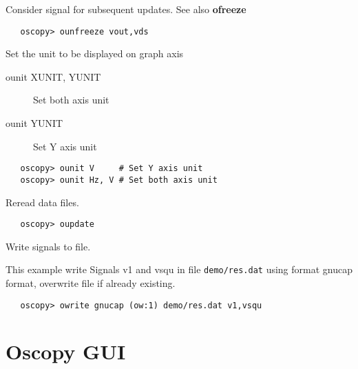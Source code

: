 \documentclass[a4paper,11pt]{article}
\begin{document}
   Consider signal for subsequent updates. See also \textbf{ofreeze}
\begin{verbatim}
   oscopy> ounfreeze vout,vds
\end{verbatim}

   Set the unit to be displayed on graph axis
   \begin{description}
   \item[ounit XUNIT, YUNIT] Set both axis unit
   \item[ounit YUNIT] Set Y axis unit
   \end{description}

\begin{verbatim}
   oscopy> ounit V     # Set Y axis unit
   oscopy> ounit Hz, V # Set both axis unit
\end{verbatim}

   Reread data files.

\begin{verbatim}
   oscopy> oupdate
\end{verbatim}

   Write signals to file.

   This example write Signals v1 and vsqu in file \texttt{demo/res.dat} using format gnucap format, overwrite file if already existing.
\begin{verbatim}
   oscopy> owrite gnucap (ow:1) demo/res.dat v1,vsqu
\end{verbatim}

\section{Oscopy GUI}
\end{document}
